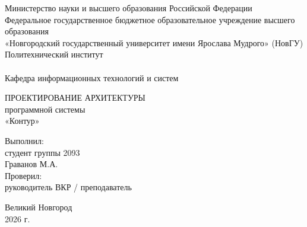 \begin{titlepage}
\begin{center}

Министерство науки и высшего образования Российской Федерации
\\
Федеральное государственное бюджетное образовательное учреждение 
высшего образования
\\
«Новгородский государственный университет имени Ярослава Мудрого» (НовГУ)
\\
Политехнический институт
\\
\tiny\underline{\hspace{16cm}}
\\
\normalsize \lsstyle Кафедра информационных технологий и систем
\\
\end{center}

\vspace*{25mm}

\begin{center}
ПРОЕКТИРОВАНИЕ АРХИТЕКТУРЫ
\\
программной системы
\\
«Контур»
\\
\end{center}

\vspace*{20mm}

\begin{flushright}
\begin{minipage}[t]{0.52\textwidth}
Выполнил:
\\
студент группы 2093
\\
Граванов М.А.
\\
Проверил:
\\
руководитель ВКР / преподаватель
\\
\underline{\hspace{55mm}}
\end{minipage}
\end{flushright}

\vfill

\begin{center}
Великий Новгород
\\
2026 г.
\end{center}
\end{titlepage}
\restoregeometry
\addtocounter{page}{1}
